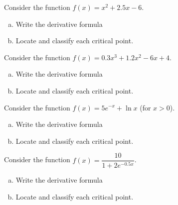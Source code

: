 \documentclass[notes]{subfiles}
\begin{document}
		\begin{ex} Consider the function $f(x) = x^2 + 2.5x - 6$.  
			\begin{enumerate}[(a)]
				\item Write the derivative formula
				\item Locate and classify each critical point.			
			\end{enumerate}
		\end{ex}
			\newpage
			
		\begin{ex} Consider the function $f(x) = 0.3x^3 + 1.2x^2 - 6x + 4$.  
			\begin{enumerate}[(a)]
				\item Write the derivative formula
				\item Locate and classify each critical point.				
			\end{enumerate}
		\end{ex}
			
		\begin{ex} Consider the function $f(x) = 5e^{-x} + \ln x$ (for $x > 0$).  
			\begin{enumerate}[(a)]
				\item Write the derivative formula
				\item Locate and classify each critical point.			
			\end{enumerate}
		\end{ex}
			\newpage
			
		\begin{ex} Consider the function $f(x) = \dfrac{10}{1 + 2e^{-0.5x}}$.  
			\begin{enumerate}[(a)]
				\item Write the derivative formula
				\item Locate and classify each critical point.			
			\end{enumerate}
		\end{ex}
		
\end{document}
